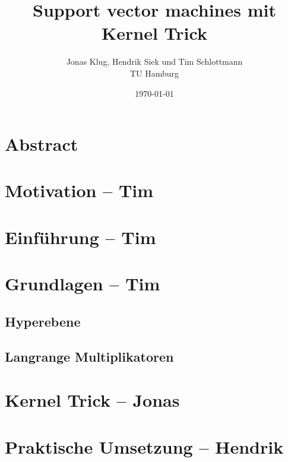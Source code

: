 \documentclass[10pt,a4paper]{scrartcl}
\title{Support vector machines mit Kernel Trick}
\author{Jonas Klug, Hendrik Siek und Tim Schlottmann \\ TU Hamburg }
\date{\today}
\begin{document}
    \maketitle

    \section{Abstract}

    \section{Motivation -- Tim}

    \section{Einführung -- Tim}

    \section{Grundlagen -- Tim}

        \subsection{Hyperebene}

        \subsection{Langrange Multiplikatoren}

    \section{Kernel Trick -- Jonas}

    \section{Praktische Umsetzung -- Hendrik}
\end{document}
